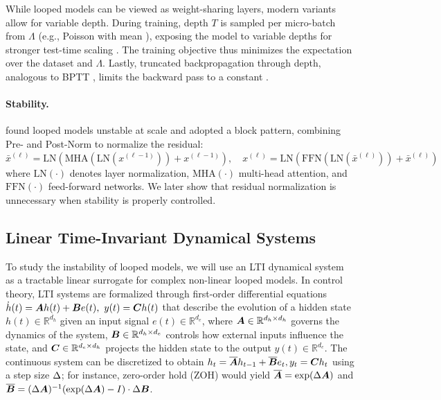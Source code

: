 While looped models can be viewed as weight-sharing layers, modern variants allow for variable depth.
During training, depth $T$ is sampled per micro-batch \cite{bansalEndtoendAlgorithmSynthesis2022} from $\Lambda$ (e.g., Poisson with mean \meanrecurrence), exposing the model to variable depths for stronger test-time scaling \citep{anilPathIndependentEquilibrium}.
The training objective thus minimizes the expectation over the dataset and $\Lambda$.
Lastly, truncated backpropagation through depth, analogous to BPTT \citep{Hinton2013TrainingRN}, limits the backward pass to a constant \meanbackward \citep{geiping_scaling_2025}. 

\paragraph{Stability.}\citet{geiping_scaling_2025} found looped models unstable at scale and adopted a block pattern, combining Pre- and Post-Norm to normalize the residual: $\bar{x}^{(\ell)} = \text{LN}(\text{MHA}(\text{LN}(x^{(\ell-1)})) + x^{(\ell-1)}), \quad x^{(\ell)} = \text{LN}(\text{FFN}(\text{LN}(\bar{x}^{(\ell)})) + \bar{x}^{(\ell)})$
where $\mathrm{LN}(\cdot)$ denotes layer normalization, $\mathrm{MHA}(\cdot)$ multi-head attention, and $\mathrm{FFN}(\cdot)$ feed-forward networks. We later show that residual normalization is unnecessary when stability is properly controlled.


\subsection{Linear Time-Invariant Dynamical Systems}
\label{sec:lti-basics}
To study the instability of looped models, we will use an LTI dynamical system as a tractable linear surrogate for complex non-linear looped models.
In control theory, LTI systems are formalized through first-order differential equations
$\dot{h}(t)= \bm{A} h(t) + \bm{B} e(t),~y(t) = \bm{C} h(t)$
that describe the evolution of a hidden state $h(t) \in \mathbb{R}^{d_h}$ given an input signal $e(t) \in \mathbb{R}^{d_e}$,
where $\bm{A} \in \mathbb{R}^{d_h \times d_h}$ governs the dynamics of the system, $\bm{B} \in \mathbb{R}^{d_h \times d_e}$ controls how external inputs influence the state, and $\bm{C} \in \mathbb{R}^{d_e \times d_h}$ projects the hidden state to the output $y(t) \in \mathbb{R}^{d_e}$. The continuous system can be discretized to obtain 
$h_{t} = \overline{\bm{A}} h_{t-1} + \overline{\bm{B}} e_t,  y_t = \bm{C} h_t$
using a step size $\Delta$; for instance, zero-order hold (ZOH) would yield $\overline{\bm{A}} = \exp(\Delta \bm{A})$ and $\overline{\bm{B}} = (\Delta \bm{A})^{-1}(\exp(\Delta \bm{A}) - I) \cdot \Delta \bm{B}$.

